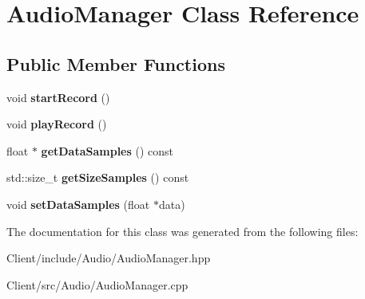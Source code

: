 \hypertarget{class_audio_manager}{}\section{Audio\+Manager Class Reference}
\label{class_audio_manager}
\subsection*{Public Member Functions}
\begin{DoxyCompactItemize}
\item 
\mbox{\label{class_audio_manager_a4c6081ec4f81730e4a96c36a7788ea74}} 
void {\bfseries start\+Record} ()
\item 
\mbox{\label{class_audio_manager_a30976c3f30e4c5d93904c2468fdae7b1}} 
void {\bfseries play\+Record} ()
\item 
\mbox{\label{class_audio_manager_a9bdf7b74899cc5674f0b0812ae43059d}} 
float $\ast$ {\bfseries get\+Data\+Samples} () const
\item 
\mbox{\label{class_audio_manager_a812a53f2ed8f9cf57f300b7df57a8dfb}} 
std\+::size\+\_\+t {\bfseries get\+Size\+Samples} () const
\item 
\mbox{\label{class_audio_manager_a12f4eea9001273f0bdb913a8e280f25f}} 
void {\bfseries set\+Data\+Samples} (float $\ast$data)
\end{DoxyCompactItemize}


The documentation for this class was generated from the following files\+:\begin{DoxyCompactItemize}
\item 
Client/include/\+Audio/Audio\+Manager.\+hpp\item 
Client/src/\+Audio/Audio\+Manager.\+cpp\end{DoxyCompactItemize}
